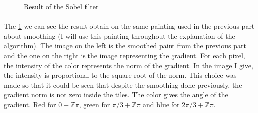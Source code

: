 \documentclass[10pt]{article}
\newcommand{\Z}{\mathbb{Z}}
\begin{document}
	\begin{figure}[h]
		\centering
		\vspace{-5mm}
		\caption{Result of the Sobel filter}
		\label{im:sob}
	\end{figure}
	\vspace{-2mm}

	\paragraph{}
	The \figurename \ref{im:sob} we can see the result obtain on the same painting used in the previous part about smoothing (I will use this painting throughout the explanation of the algorithm). The image on the left is the smoothed paint from the previous part and the one on the right is the image representing the gradient. For each pixel, the intensity of the color represents the norm of the gradient. In the image I give, the intensity is proportional to the square root of the norm. This choice was made so that it could be seen that despite the smoothing done previously, the gradient norm is not zero inside the tiles. The color gives the angle of the gradient. Red for $0+\Z \pi$, green for $\pi / 3 + \Z \pi$ and blue for $2\pi / 3 + \Z \pi$.
	
\end{document}
